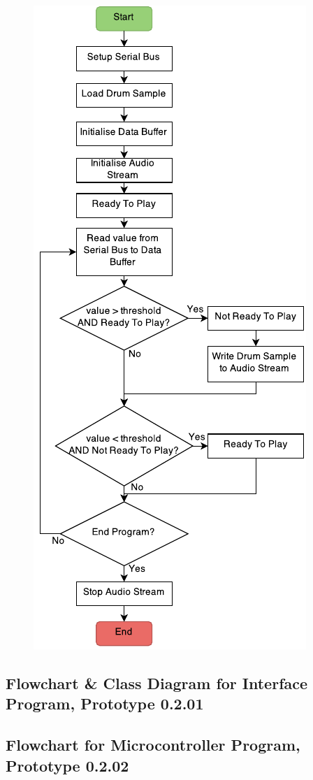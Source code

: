 \begin{figure}[H]
{\includegraphics[scale = 1]{Images/interfacesampleflow}
}
\end{figure}

\subsection{Flowchart \& Class Diagram for Interface Program, Prototype 0.2.01}

\subsection{Flowchart for Microcontroller Program, Prototype 0.2.02}

